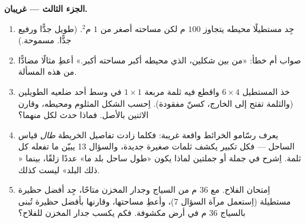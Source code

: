 \begin{problem}
\medskip
\noindent\textbf{الجزء الثالث ---   غريبان.}
\begin{enumerate}[resume]
  \item جِد مستطيلًا محيطه يتجاوز $100$ م لكن
        مساحته أصغر من $1$ م$^2$. (طويل جدًّا ورفيع
        جدًّا.  مسموحة.)
  \item صواب أم خطأ: «من بين شكلين، الذي محيطه
        أكبر مساحته أكبر.» أعطِ مثالًا مضادًّا
        من هذه المسألة.
  \item خذ المستطيل $6 \times 4$ واقطع فيه ثلمة مربعة
        $1 \times 1$ في وسط أحد ضلعيه الطويلين (والثلمة
        تفتح إلى الخارج، كسنّ مفقودة). اِحسب 
        الشكل المثلوم ومحيطه، وقارن الاثنين
        بالأصل. فماذا حدث لكل منهما؟
  \item يعرف رسّامو الخرائط واقعة غريبة: فكلما زادت تفاصيل الخريطة
        \emph{طال} قياس الساحل --- فكل تكبير
        يكشف ثلمات صغيرة جديدة، والسؤال 13 يبيّن ما
        تفعله كل ثلمة. اِشرح في جملة أو جملتين لماذا
        يكون «طول ساحل بلد ما» عددًا زلقًا،
        بينما « ذلك البلد» ليست كذلك.
  \item اِمتحان الفلاح. مع $36$ م من السياج وجدار
        المخزن متاحًا، جِد أفضل حظيرة مستطيلة (اِستعمل
        مرآة السؤال 7)، وأعطِ مساحتها، وقارنها
        بأفضل حظيرة تُبنى بالسياج $36$ م في أرض مكشوفة. فكم
        يكسب جدار المخزن للفلاح؟
\end{enumerate}
\end{problem}
